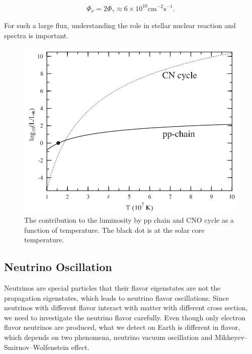 \documentclass[%
 aip,
 jmp,%
 amsmath,amssymb,
 reprint,%
]{revtex4-1}
\begin{document}
\begin{equation}
\Phi_\nu = 2 \Phi_\gamma \approx 6\times 10^{10} \mathrm{cm^{-2}s^{-1}}.
\end{equation}


For such a large flux, understanding the role in stellar nuclear reaction and spectra is important.




\begin{figure}[!hbtp]
\centering
\includegraphics[width=\columnwidth]{assets/pp_chain_vs_cno.png}
\caption{The contribution to the luminosity by pp chain and CNO cycle as a function of temperature.\cite{Adelberger2011a} The black dot is at the solar core temperature.}
\label{fig:pp_chain_vs_cno}
\end{figure}












\subsection{Neutrino Oscillation}


Neutrinos are special particles that their flavor eigenstates are not the propagation eigenstates, which leads to neutrino flavor oscillations. Since neutrinos with different flavor interact with matter with different cross section, we need to investigate the neutrino flavor carefully. Even though only electron flavor neutrinos are produced, what we detect on Earth is different in flavor, which depends on two phenomena, neutrino vacuum oscillation and Mikheyev–Smirnov–Wolfenstein effect.
\end{document}
